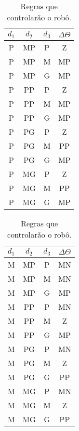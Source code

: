 				\begin{table}[H]
					\centering
					\caption{\label{tab:consequentes} Regras que controlarão o robô.}
					\setlength\tabcolsep{4pt}
					\begin{minipage}{0.30\textwidth}
					    \centering
						\begin{tabular}{| c | c | c | c |} 
						\hline
						\(d_1\) & \(d_2\) & \(d_3\) & \(\Delta \Theta\) \\ \hline
						P & MP & P & Z  \\ \hline
						P & MP & M & MP \\ \hline
						P & MP & G & MP \\ \hline
						P & PP & P & Z  \\ \hline
						P & PP & M & MP \\ \hline
						P & PP & G & MP \\ \hline
						P & PG & P & Z  \\ \hline
						P & PG & M & PP \\ \hline
						P & PG & G & MP \\ \hline
						P & MG & P & Z  \\ \hline
						P & MG & M & PP \\ \hline
						P & MG & G & MP \\ \hline
						\end{tabular}	
					\end{minipage}	      
					\begin{minipage}{0.30\textwidth}
					    \centering
						\begin{tabular}{| c | c | c | c |} 
						\hline
						\(d_1\) & \(d_2\) & \(d_3\) & \(\Delta \Theta\) \\ \hline
						M & MP & P & MN \\ \hline
						M & MP & M & MN \\ \hline
						M & MP & G & MP \\ \hline
						M & PP & P & MN \\ \hline
						M & PP & M & Z  \\ \hline
						M & PP & G & MP \\ \hline
						M & PG & P & MN \\ \hline
						M & PG & M & Z  \\ \hline
						M & PG & G & PP \\ \hline
						M & MG & P & MN \\ \hline
						M & MG & M & Z  \\ \hline
						M & MG & G & PP \\ \hline

\end{tabular}
\end{minipage}
\end{table}
